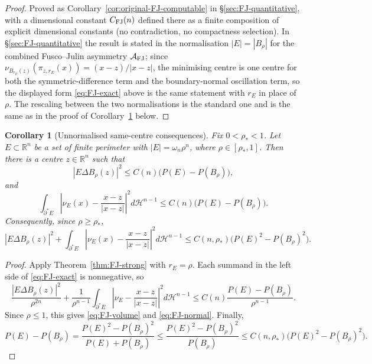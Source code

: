 \documentclass[11pt]{amsart}
\newtheorem{corollary}[theorem]{Corollary}
\theoremstyle{definition}
\newcommand{\R}{\mathbb R}
\newcommand{\rstar}{\rho_*}
\newcommand{\Hn}{\mathcal H^{n-1}}
\newcommand{\Per}{P}
\begin{document}
\begin{proof}
Proved as Corollary~\ref{cor:original-FJ-computable} in
\S\ref{sec:FJ-quantitative}, with a dimensional constant
\(C_{\rm FJ}(n)\) defined there as a finite composition of explicit
dimensional constants (no contradiction, no compactness selection).
In \S\ref{sec:FJ-quantitative} the result is stated in the
normalisation \(|E|=|B_\rho|\) for the combined Fusco--Julin asymmetry
\(\mathcal A_{\rm FJ}\); since
\(\nu_{B_{r_E}(z)}(\pi_{z,r_E}(x))=(x-z)/|x-z|\), the minimising centre
is one centre for both the symmetric-difference term and the
boundary-normal oscillation term, so the displayed form
\eqref{eq:FJ-exact} above is the same statement with \(r_E\) in place
of \(\rho\).  The rescaling between the two normalisations is the
standard one and is the same as in the proof of
Corollary~\ref{cor:FJ-unnormalised} below.
\end{proof}

\begin{corollary}[Unnormalised same-centre consequences]
\label{cor:FJ-unnormalised}
Fix \(0<\rstar<1\).  Let \(E\subset\R^n\) be a set of finite perimeter with
\(|E|=\omega_n\rho^n\), where \(\rho\in[\rstar,1]\).  Then there is a
centre \(z\in\R^n\) such that
\begin{equation}\label{eq:FJ-volume}
   |E\Delta B_\rho(z)|^2
   \le C(n)\bigl(\Per(E)-\Per(B_\rho)\bigr),
\end{equation}
and
\begin{equation}\label{eq:FJ-normal}
   \int_{\partial^*E}
      \left|\nu_E(x)-\frac{x-z}{|x-z|}\right|^2d\Hn
   \le C(n)\bigl(\Per(E)-\Per(B_\rho)\bigr).
\end{equation}
Consequently, since \(\rho\ge\rstar\),
\begin{equation}\label{eq:FJ-DI-version}
   |E\Delta B_\rho(z)|^2
   +
   \int_{\partial^*E}
      \left|\nu_E(x)-\frac{x-z}{|x-z|}\right|^2d\Hn
   \le C(n,\rstar)
      \bigl(\Per(E)^2-\Per(B_\rho)^2\bigr).
\end{equation}
\end{corollary}

\begin{proof}
Apply Theorem~\ref{thm:FJ-strong} with \(r_E=\rho\).  Each summand in the
left side of \eqref{eq:FJ-exact} is nonnegative, so
\[
   \frac{|E\Delta B_\rho(z)|^2}{\rho^{2n}}
   +
   \frac1{\rho^{n-1}}
   \int_{\partial^*E}
      \left|\nu_E-\frac{x-z}{|x-z|}\right|^2d\Hn
   \le
   C(n)\frac{\Per(E)-\Per(B_\rho)}{\rho^{n-1}} .
\]
Since \(\rho\le1\), this gives \eqref{eq:FJ-volume} and
\eqref{eq:FJ-normal}.  Finally,
\[
   \Per(E)-\Per(B_\rho)
   =
   \frac{\Per(E)^2-\Per(B_\rho)^2}{\Per(E)+\Per(B_\rho)}
   \le
   \frac{\Per(E)^2-\Per(B_\rho)^2}{\Per(B_\rho)}
   \le C(n,\rstar)\bigl(\Per(E)^2-\Per(B_\rho)^2\bigr).
\]
\end{proof}
\end{document}
